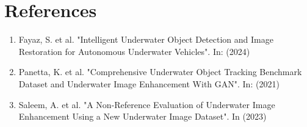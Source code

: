 \documentclass{article}
\begin{document}
\section*{References}
\begin{enumerate}
    \item Fayaz, S. et al. "Intelligent Underwater Object Detection and Image Restoration for Autonomous Underwater Vehicles". In: (2024)

    \item Panetta, K. et al. "Comprehensive Underwater Object Tracking Benchmark Dataset and Underwater Image Enhancement With GAN". In: (2021)

    \item Saleem, A. et al. "A Non-Reference Evaluation of Underwater Image Enhancement Using a New Underwater Image Dataset". In (2023)


\end{enumerate}
\end{document}
